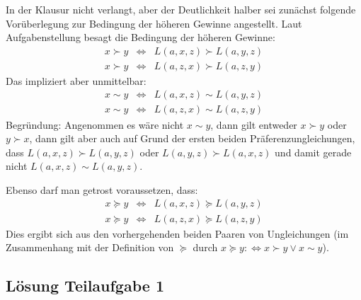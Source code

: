 \documentclass[10pt, a4paper, german]{article}
\numberwithin {equation}{section}
\begin{document}

  
  


In der Klausur nicht verlangt, aber der Deutlichkeit halber sei
zunächst folgende Vorüberlegung zur Bedingung der höheren
Gewinne angestellt. Laut Aufgabenstellung besagt die Bedingung der höheren
Gewinne:
\begin{eqnarray}
x \succ y & \Leftrightarrow & L(a,x,z) \succ L(a,y,z) \\
x \succ y & \Leftrightarrow & L(a,z,x) \succ L(a,z,y)
\end{eqnarray}
Das impliziert aber unmittelbar: 
\begin{eqnarray}
x \sim y & \Leftrightarrow & L(a,x,z) \sim L(a,y,z) \\
x \sim y & \Leftrightarrow & L(a,z,x) \sim L(a,z,y)
\end{eqnarray}
Begründung: Angenommen es wäre nicht $x \sim y$, dann gilt entweder $x
\succ y$ oder $y \succ x$, dann gilt aber auch auf Grund der ersten
beiden Präferenzungleichungen, dass $L(a,x,z) \succ L(a,y,z)$ oder
$L(a,y,z) \succ L(a,x,z)$ und damit gerade nicht $L(a,x,z) \sim
L(a,y,z)$.

\vspace{0.1cm}
Ebenso darf man getrost voraussetzen, dass:
\begin{eqnarray}
x \succeq y & \Leftrightarrow & L(a,x,z) \succeq L(a,y,z) \\
x \succeq y & \Leftrightarrow & L(a,z,x) \succeq L(a,z,y)
\end{eqnarray}
Dies ergibt sich aus den vorhergehenden beiden Paaren von Ungleichungen
(im Zusammenhang mit der Definition von $\succeq$ durch $x \succeq y
:\Leftrightarrow x \succ y \vee x \sim y$).


\subsection{Lösung Teilaufgabe 1}
\end{document}
